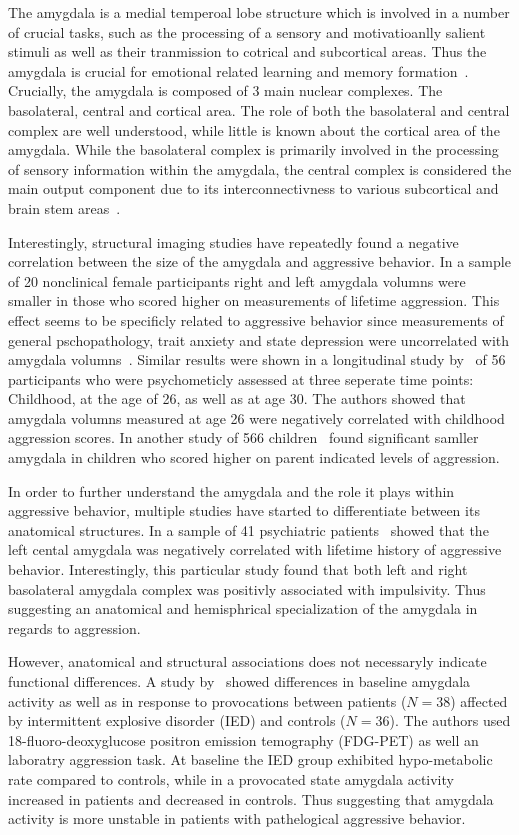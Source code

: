 The amygdala is a medial temperoal lobe structure which is involved in a number of crucial tasks, such as the processing of a sensory and motivatioanlly salient stimuli as well as their tranmission to cotrical and subcortical areas.
Thus the amygdala is crucial for emotional related learning and memory formation~\cite{Salzman2010}.
Crucially, the amygdala is composed of 3 main nuclear complexes.
The basolateral, central and cortical area.
The role of both the basolateral and central complex are well understood, while little is known about the cortical area of the amygdala.
While the basolateral complex is primarily involved in the processing of sensory information within the amygdala, the central complex is considered the main output component due to its interconnectivness to various subcortical and brain stem areas~\cite{Sah2003}.

Interestingly, structural imaging studies have repeatedly found a negative correlation between the size of the amygdala and aggressive behavior.
In a sample of 20 nonclinical female participants right and left amygdala volumns were smaller in those who scored higher on measurements of lifetime aggression.
This effect seems to be specificly related to aggressive behavior since measurements of general pschopathology, trait anxiety and state depression were uncorrelated with amygdala volumns~\cite{Matthies2012}.
Similar results were shown in a longitudinal study by~\citet{Pardini2014} of 56 participants who were psychometicly assessed at three seperate time points: Childhood, at the age of 26, as well as at age 30.
The authors showed that amygdala volumns measured at age 26 were negatively correlated with childhood aggression scores.
In another study of 566 children~\citet{Thijssen2015} found significant samller amygdala in children who scored higher on parent indicated levels of aggression.

In order to further understand the amygdala and the role it plays within aggressive behavior, multiple studies have started to differentiate between its anatomical structures.
In a sample of 41 psychiatric patients~\citet{Gopal2013} showed that the left cental amygdala was negatively correlated with lifetime history of aggressive behavior.
Interestingly, this particular study found that both left and right basolateral amygdala complex was positivly associated with impulsivity.
Thus suggesting an anatomical and hemisphrical specialization of the amygdala in regards to aggression.

However, anatomical and structural associations does not necessaryly indicate functional differences.
A study by~\citet{New2009} showed differences in baseline amygdala activity as well as in response to provocations between patients ($N=38$) affected by intermittent explosive disorder (IED) and controls ($N=36$).
The authors used 18-fluoro-deoxyglucose positron emission temography (FDG-PET) as well an laboratry aggression task.
At baseline the IED group exhibited hypo-metabolic rate compared to controls, while in a provocated state amygdala activity increased in patients and decreased in controls.
Thus suggesting that amygdala activity is more unstable in patients with pathelogical aggressive behavior.

